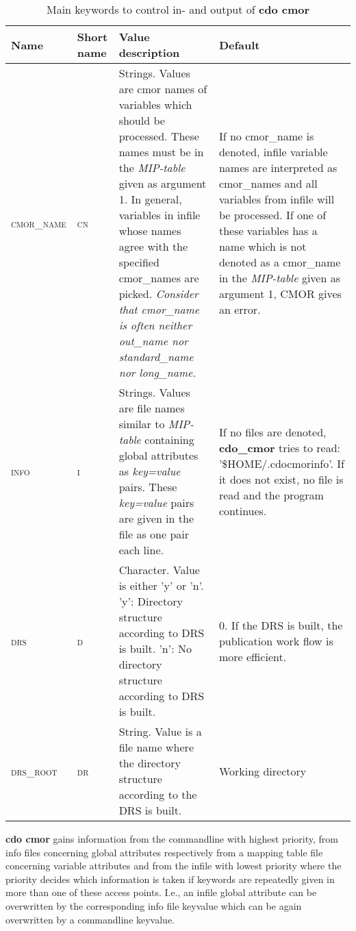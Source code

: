 \begin{table}[H]
\caption{Main keywords to control in- and output of \textbf{cdo cmor}}
\label{table:MainKey}
\begin{tabular}[H]{|p{2cm}|p{1cm}|p{5.5cm} | p{5.5cm} | }
\hline 
\textbf{Name} & \textbf{Short name} & \textbf{Value description} & \textbf{Default} \\ 
\hline 
\textsc{cmor\_name} & \textsc{cn} & Strings. Values are cmor names of variables which should be processed. These names must be in the \textit{MIP-table} given as argument 1. In general, variables in infile whose names agree with the specified cmor\_names are picked. \textit{Consider that cmor\_name is often neither out\_name nor standard\_name nor long\_name.} & If no cmor\_name is denoted, infile variable names are interpreted as cmor\_names and all variables from infile will be processed. If one of these variables has a name which is not denoted as a cmor\_name in the \textit{MIP-table} given as argument 1, CMOR gives an error.  \\ 
\hline 
\textsc{info} & \textsc{i} & Strings. Values are file names similar to \textit{MIP-table} containing global attributes as \textit{key=value} pairs. These \textit{key=value} pairs are given in the file as one pair each line. & If no files are denoted, \textbf{cdo\_cmor} tries to read: '\$HOME/.cdocmorinfo'. If it does not exist, no file is read and the program continues.\\ 
\hline
\textsc{drs} & \textsc{d} & Character. Value is either 'y' or 'n'. 'y': Directory structure according to DRS is built. 'n': No directory structure according to DRS is built. & 0. If the DRS is built, the publication work flow is more efficient. \\ 
\hline 
\textsc{drs\_root} & \textsc{dr} & String. Value is a file name where the directory structure according to the DRS is built. & Working directory \\ 
\hline 
\end{tabular} 
\end{table}

\textbf{cdo cmor} gains information from the commandline with highest priority, from info files concerning global attributes respectively from a mapping table file concerning variable attributes and from the infile with lowest priority where the priority decides which information is taken if keywords are repeatedly given in more than one of these access points. I.e., an infile global attribute can be overwritten by the corresponding info file keyvalue which can be again overwritten by a commandline keyvalue.

